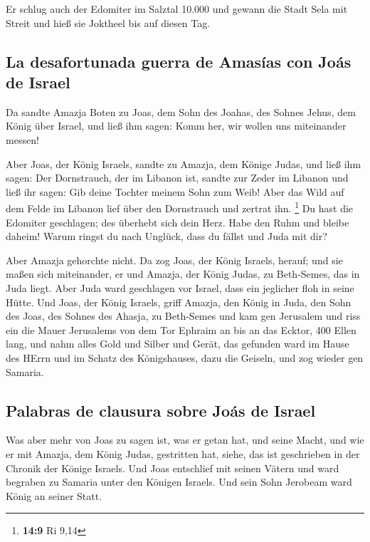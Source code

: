  Er schlug auch der Edomiter im Salztal 10.000 und gewann
die Stadt Sela mit Streit und hieß sie Joktheel bis auf diesen Tag.

\hypertarget{la-desafortunada-guerra-de-amasuxedas-con-jouxe1s-de-israel}{%
\subsection{La desafortunada guerra de Amasías con Joás de
Israel}\label{la-desafortunada-guerra-de-amasuxedas-con-jouxe1s-de-israel}}

 Da sandte Amazja Boten zu Joas, dem Sohn des Joahas, des
Sohnes Jehus, dem König über Israel, und ließ ihm sagen: Komm her, wir
wollen uns miteinander messen!

 Aber Joas, der König Israels, sandte zu Amazja, dem
Könige Judas, und ließ ihm sagen: Der Dornstrauch, der im Libanon ist,
sandte zur Zeder im Libanon und ließ ihr sagen: Gib deine Tochter meinem
Sohn zum Weib! Aber das Wild auf dem Felde im Libanon lief über den
Dornstrauch und zertrat ihn. \footnote{\textbf{14:9} Ri 9,14}
 Du hast die Edomiter geschlagen; des überhebt sich dein
Herz. Habe den Ruhm und bleibe daheim! Warum ringst du nach Unglück,
dass du fällst und Juda mit dir?

 Aber Amazja gehorchte nicht. Da zog Joas, der König
Israels, herauf; und sie maßen sich miteinander, er und Amazja, der
König Judas, zu Beth-Semes, das in Juda liegt.  Aber Juda
ward geschlagen vor Israel, dass ein jeglicher floh in seine Hütte.
 Und Joas, der König Israels, griff Amazja, den König in
Juda, den Sohn des Joas, des Sohnes des Ahasja, zu Beth-Semes und kam
gen Jerusalem und riss ein die Mauer Jerusalems von dem Tor Ephraim an
bis an das Ecktor, 400 Ellen lang,  und nahm alles Gold
und Silber und Gerät, das gefunden ward im Hause des HErrn und im Schatz
des Königshauses, dazu die Geiseln, und zog wieder gen Samaria.

\hypertarget{palabras-de-clausura-sobre-jouxe1s-de-israel}{%
\subsection{Palabras de clausura sobre Joás de
Israel}\label{palabras-de-clausura-sobre-jouxe1s-de-israel}}

 Was aber mehr von Joas zu sagen ist, was er getan hat,
und seine Macht, und wie er mit Amazja, dem König Judas, gestritten hat,
siehe, das ist geschrieben in der Chronik der Könige Israels.
 Und Joas entschlief mit seinen Vätern und ward begraben
zu Samaria unter den Königen Israels. Und sein Sohn Jerobeam ward König
an seiner Statt.

